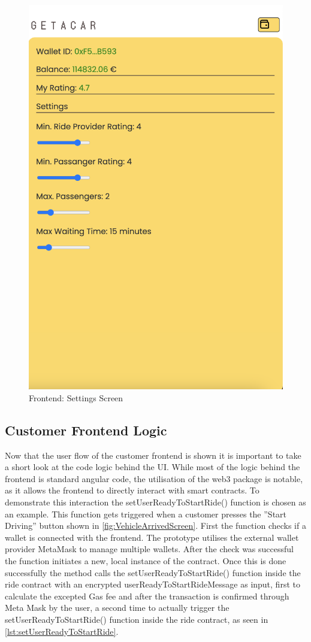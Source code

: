 \begin{figure}[H]
    \centering
    \includegraphics[width=0.45\linewidth]{data/ffss/13.png}
    \caption{Frontend: Settings Screen}
    \label{fig:SettingsScreen}
\end{figure}


\subsection{Customer Frontend Logic}
Now that the user flow of the customer frontend is shown it is important to take a short look at the code logic behind the UI. While most of the logic behind the frontend is standard angular code, the utilisation of the web3 package is notable, as it allows the frontend to directly interact with smart contracts. To demonstrate this interaction the setUserReadyToStartRide() function is chosen as an example. This function gets triggered when a customer presses the ''Start Driving'' button shown in \ref{fig:VehicleArrivedScreen}. First the function checks if a wallet is connected with the frontend. The prototype utilises the external wallet provider MetaMask to manage multiple wallets. After the check was successful the function initiates a new, local instance of the contract. Once this is done successfully the method calls the setUserReadyToStartRide() function inside the ride contract with an encrypted userReadyToStartRideMessage as input, first to calculate the excepted Gas fee and after the transaction is confirmed through Meta Mask by the user, a second time to actually trigger the setUserReadyToStartRide() function inside the ride contract, as seen in \ref{lst:setUserReadyToStartRide}.


